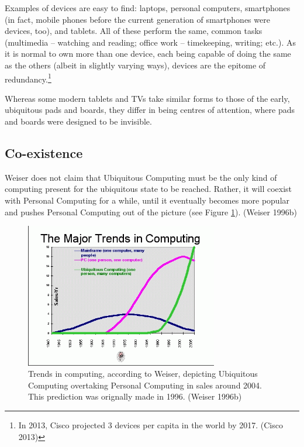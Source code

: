 Examples of devices are easy to find: laptops, personal computers, smartphones (in fact, mobile phones before the current generation
of smartphones were devices, too), and tablets. All of these perform the same, common
tasks (multimedia -- watching and reading; office work -- timekeeping, writing; etc.). As it is normal to own more than one device,
each being capable of doing the same as the others (albeit in slightly varying ways), devices are the epitome of
redundancy.\footnote{In 2013, Cisco projected 3 devices per capita in the world by 2017. (Cisco 2013)}

Whereas some modern tablets and TVs take similar forms to those of the early, ubiquitous pads and boards, they differ in being
centres of attention, where pads and boards were designed to be invisible.

\subsection*{Co-existence}

Weiser does not claim that Ubiquitous Computing must be the only kind of computing present for the ubiquitous state to be reached.
Rather, it will coexist with Personal Computing for a while, until it eventually becomes more popular and pushes Personal Computing
out of the picture (see Figure \ref{fig:trends-graph}). (Weiser 1996b)

\begin{figure}[htb]
	\centering
	\includegraphics[width=0.75\textwidth]{multipurpose/trends-graph}
	\caption{Trends in computing, according to Weiser, depicting Ubiquitous Computing overtaking Personal Computing in sales around
		2004. This prediction was orignally made in 1996. (Weiser 1996b)}
	\label{fig:trends-graph}
\end{figure}

